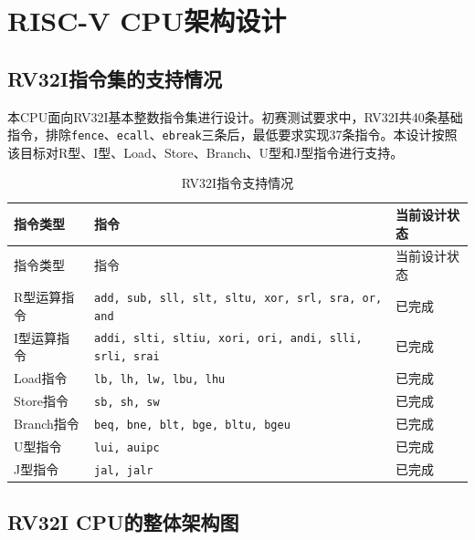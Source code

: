 \documentclass[UTF8,a4paper,12pt]{ctexart}
\newcommand{\code}[1]{\texttt{#1}}
\begin{document}
\section{RISC-V CPU架构设计}

\subsection{RV32I指令集的支持情况}

本CPU面向RV32I基本整数指令集进行设计。初赛测试要求中，RV32I共40条基础指令，排除\code{fence}、\code{ecall}、\code{ebreak}三条后，最低要求实现37条指令。本设计按照该目标对R型、I型、Load、Store、Branch、U型和J型指令进行支持。

\begin{longtable}{p{3cm}p{8cm}p{3cm}}
\caption{RV32I指令支持情况}\\
\toprule
指令类型 & 指令 & 当前设计状态 \\
\midrule
\endfirsthead
\toprule
指令类型 & 指令 & 当前设计状态 \\
\midrule
\endhead
R型运算指令 & \code{add, sub, sll, slt, sltu, xor, srl, sra, or, and} & 已完成 \\
I型运算指令 & \code{addi, slti, sltiu, xori, ori, andi, slli, srli, srai} & 已完成 \\
Load指令 & \code{lb, lh, lw, lbu, lhu} & 已完成 \\
Store指令 & \code{sb, sh, sw} & 已完成 \\
Branch指令 & \code{beq, bne, blt, bge, bltu, bgeu} & 已完成 \\
U型指令 & \code{lui, auipc} & 已完成 \\
J型指令 & \code{jal, jalr} & 已完成  \\
\bottomrule
\end{longtable}

\subsection{RV32I CPU的整体架构图}
\end{document}
